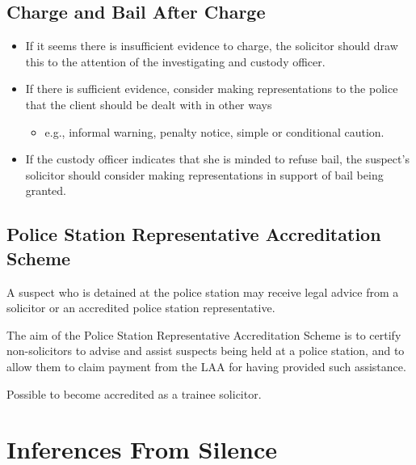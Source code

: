 \documentclass[
]{article}
\providecommand{\tightlist}{%
  \setlength{\itemsep}{0pt}\setlength{\parskip}{0pt}}
\begin{document}
\hypertarget{charge-and-bail-after-charge}{%
\subsection{Charge and Bail After
Charge}\label{charge-and-bail-after-charge}}

\begin{itemize}
\tightlist
\item
  If it seems there is insufficient evidence to charge, the solicitor
  should draw this to the attention of the investigating and custody
  officer.
\item
  If there is sufficient evidence, consider making representations to
  the police that the client should be dealt with in other ways

  \begin{itemize}
  \tightlist
  \item
    e.g., informal warning, penalty notice, simple or conditional
    caution.
  \end{itemize}
\item
  If the custody officer indicates that she is minded to refuse bail,
  the suspect's solicitor should consider making representations in
  support of bail being granted.
\end{itemize}

\hypertarget{police-station-representative-accreditation-scheme}{%
\subsection{Police Station Representative Accreditation
Scheme}\label{police-station-representative-accreditation-scheme}}

A suspect who is detained at the police station may receive legal advice
from a solicitor or an accredited police station representative.

The aim of the Police Station Representative Accreditation Scheme is to
certify non-solicitors to advise and assist suspects being held at a
police station, and to allow them to claim payment from the LAA for
having provided such assistance.

Possible to become accredited as a trainee solicitor.

\hypertarget{inferences-from-silence}{%
\section{Inferences From Silence}\label{inferences-from-silence}}
\end{document}

